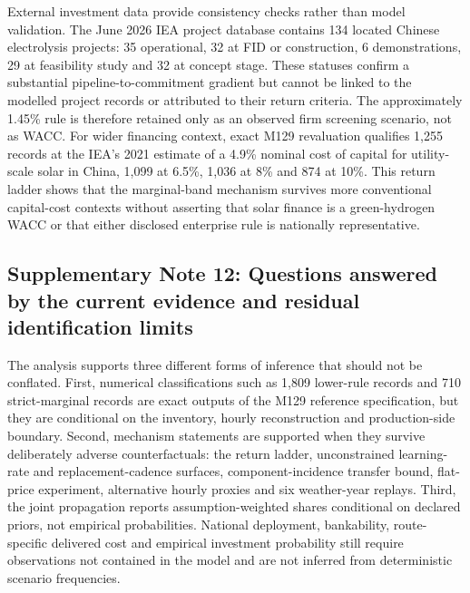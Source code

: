 \documentclass[pdflatex,sn-nature]{sn-jnl}
\begin{document}
External investment data provide consistency checks rather than model validation. The June 2026 IEA project database contains 134 located Chinese electrolysis projects: 35 operational, 32 at FID or construction, 6 demonstrations, 29 at feasibility study and 32 at concept stage\cite{ieaprojects2026}. These statuses confirm a substantial pipeline-to-commitment gradient but cannot be linked to the modelled project records or attributed to their return criteria. The approximately 1.45\% rule is therefore retained only as an observed firm screening scenario, not as WACC. For wider financing context, exact M129 revaluation qualifies 1,255 records at the IEA's 2021 estimate of a 4.9\% nominal cost of capital for utility-scale solar in China, 1,099 at 6.5\%, 1,036 at 8\% and 874 at 10\%\cite{ieacapital}. This return ladder shows that the marginal-band mechanism survives more conventional capital-cost contexts without asserting that solar finance is a green-hydrogen WACC or that either disclosed enterprise rule is nationally representative.

\subsection*{Supplementary Note 12: Questions answered by the current evidence and residual identification limits}

The analysis supports three different forms of inference that should not be conflated. First, numerical classifications such as 1,809 lower-rule records and 710 strict-marginal records are exact outputs of the M129 reference specification, but they are conditional on the inventory, hourly reconstruction and production-side boundary. Second, mechanism statements are supported when they survive deliberately adverse counterfactuals: the return ladder, unconstrained learning-rate and replacement-cadence surfaces, component-incidence transfer bound, flat-price experiment, alternative hourly proxies and six weather-year replays. Third, the joint propagation reports assumption-weighted shares conditional on declared priors, not empirical probabilities. National deployment, bankability, route-specific delivered cost and empirical investment probability still require observations not contained in the model and are not inferred from deterministic scenario frequencies.
\end{document}
